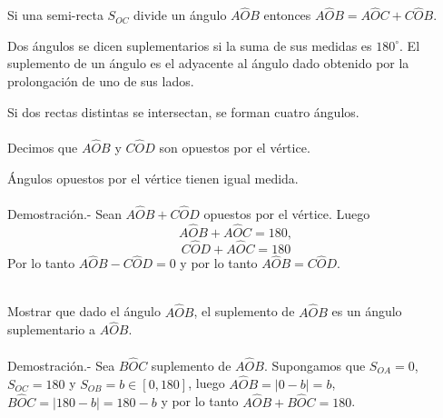 \begin{tcolorbox}[colframe=white]
    \begin{axioma}
	Si una semi-recta $S_{OC}$ divide un ángulo $A\widehat{O}B$ entonces $A\widehat{O}B = A\widehat{O}C + C\widehat{O}B$.
    \end{axioma}
\end{tcolorbox}

\begin{tcolorbox}[colframe=white]
    \begin{def.}
	Dos ángulos se dicen suplementarios si la suma de sus medidas es $180^{\circ}$. El suplemento de un ángulo es el adyacente al ángulo dado obtenido por la prolongación de uno de sus lados.
    \end{def.}
\end{tcolorbox}

\begin{tcolorbox}[colframe=white]
    \begin{def.}
	Si dos rectas distintas se intersectan, se forman cuatro ángulos.\\\\
	Decimos que $A\widehat{O}B$ y $C\widehat{O}D$ son opuestos por el vértice.
    \end{def.}
\end{tcolorbox}

    \begin{proposicion}
	Ángulos opuestos por el vértice tienen igual medida.\\\\
	    Demostración.-\; Sean $A\widehat{O}B + C\widehat{O}D $ opuestos por el vértice. Luego $$A\widehat{O}B + A\widehat{O}C = 180,$$ $$C\widehat{O}D + A\widehat{O}C = 180$$ Por lo tanto $A\widehat{O}B - C\widehat{O}D = 0$ y por lo tanto $A\widehat{O}B=C\widehat{O}D.$\\\\
    \end{proposicion}

    \begin{teo}
	Mostrar que dado el ángulo $A\widehat{O}B$, el suplemento de $A\widehat{O}B$ es un ángulo suplementario a $A\widehat{O}B$.\\\\
	    Demostración.-\; Sea $B\widehat{O}C$ suplemento de $A\widehat{O}B$. Supongamos que $S_{OA}=0$, $S_{OC}=180$ y $S_{OB} = b \in [0,180]$, luego $A\widehat{O}B = |0-b|=b$, $B\widehat{O}C = |180 - b| = 180-b$ y por lo tanto $A\widehat{O}B + B\widehat{O}C = 180$.\\\\
    \end{teo}


